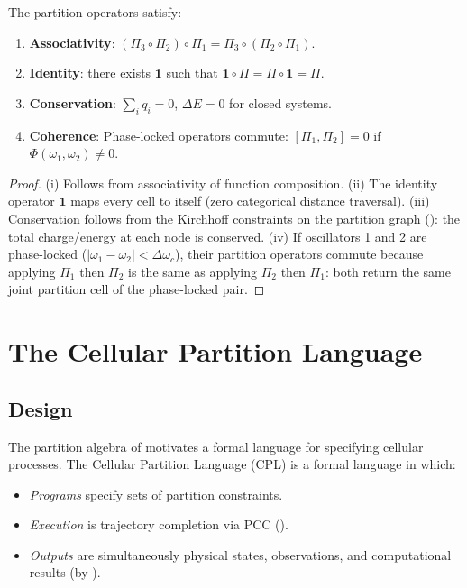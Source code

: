 \begin{theorem}
\label{thm:algebra-laws}
The partition operators satisfy:
\begin{enumerate}[label=(\roman*)]
    \item \textbf{Associativity}:
          $(\Pi_3 \circ \Pi_2) \circ \Pi_1 = \Pi_3 \circ (\Pi_2 \circ \Pi_1)$.
    \item \textbf{Identity}: there exists $\mathbf{1}$ such that
          $\mathbf{1} \circ \Pi = \Pi \circ \mathbf{1} = \Pi$.
    \item \textbf{Conservation}: $\sum_i q_i = 0$, $\Delta E = 0$ for closed
          systems.
    \item \textbf{Coherence}: Phase-locked operators commute:
          $[\Pi_1, \Pi_2] = 0$ if $\Phi(\omega_1, \omega_2) \ne 0$.
\end{enumerate}
\end{theorem}

\begin{proof}
(i) Follows from associativity of function composition.
(ii) The identity operator $\mathbf{1}$ maps every cell to itself (zero
categorical distance traversal).
(iii) Conservation follows from the Kirchhoff constraints on the partition
graph (): the total charge/energy at each node is conserved.
(iv) If oscillators 1 and 2 are phase-locked ($|\omega_1 - \omega_2| <
\Delta\omega_c$), their partition operators commute because applying $\Pi_1$
then $\Pi_2$ is the same as applying $\Pi_2$ then $\Pi_1$: both return the
same joint partition cell of the phase-locked pair.
\end{proof}

\section{The Cellular Partition Language}
\label{sec:cpl}

\subsection{Design}

The partition algebra of  motivates a
formal language for specifying cellular processes.  The Cellular Partition
Language (CPL) is a formal language in which:

\begin{itemize}[noitemsep]
    \item \emph{Programs} specify sets of partition constraints.
    \item \emph{Execution} is trajectory completion via PCC
          ().
    \item \emph{Outputs} are simultaneously physical states, observations,
          and computational results (by ).
\end{itemize}

